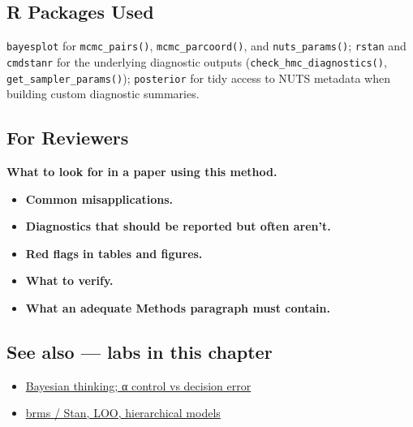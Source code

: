 \documentclass[
]{article}
\providecommand{\tightlist}{%
  \setlength{\itemsep}{0pt}\setlength{\parskip}{0pt}}
\begin{document}
\subsection{R Packages Used}\label{r-packages-used}

\texttt{bayesplot} for \texttt{mcmc\_pairs()},
\texttt{mcmc\_parcoord()}, and \texttt{nuts\_params()}; \texttt{rstan}
and \texttt{cmdstanr} for the underlying diagnostic outputs
(\texttt{check\_hmc\_diagnostics()}, \texttt{get\_sampler\_params()});
\texttt{posterior} for tidy access to NUTS metadata when building custom
diagnostic summaries.

\subsection{For Reviewers}\label{for-reviewers}

\textbf{What to look for in a paper using this method.}

\begin{itemize}
\tightlist
\item
  \textbf{Common misapplications.}
\item
  \textbf{Diagnostics that should be reported but often aren't.}
\item
  \textbf{Red flags in tables and figures.}
\item
  \textbf{What to verify.}
\item
  \textbf{What an adequate Methods paragraph must contain.}
\end{itemize}

\subsection{See also --- labs in this
chapter}\label{see-also-labs-in-this-chapter}

\begin{itemize}
\tightlist
\item
  \href{labs/lab-bayesian-thinking-control-vs-decision-error.Rmd}{Bayesian
  thinking; α control vs decision error}
\item
  \href{labs/lab-brms-stan-loo-hierarchical-models.Rmd}{brms / Stan,
  LOO, hierarchical models}
\end{itemize}
\end{document}
